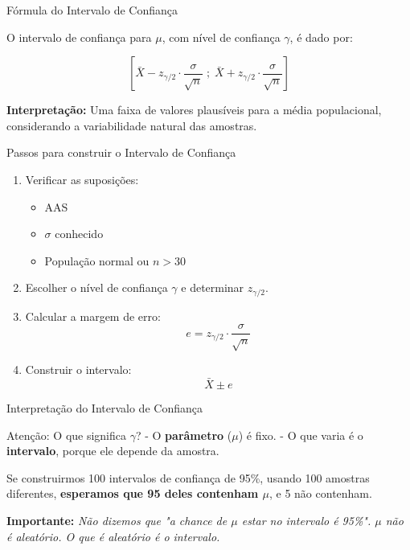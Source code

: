 \documentclass[14pt,aspectratio=1610]{beamer}
\begin{document}
\begin{frame}{Fórmula do Intervalo de Confiança}
	\begin{block}{}
		O intervalo de confiança para $\mu$, com nível de confiança $\gamma$, é dado por:
		
		\[
		\left[
		\bar{X} - z_{\gamma/2} \cdot \frac{\sigma}{\sqrt{n}} \; ; \;
		\bar{X} + z_{\gamma/2} \cdot \frac{\sigma}{\sqrt{n}}
		\right]
		\]
		
		\textbf{Interpretação:} Uma faixa de valores plausíveis para a média populacional, considerando a variabilidade natural das amostras.
	\end{block}
\end{frame}

\begin{frame}{Passos para construir o Intervalo de Confiança}
	\begin{enumerate}
		\item Verificar as suposições:
		\begin{itemize}
			\item AAS
			\item $\sigma$ conhecido
			\item População normal ou $n > 30$
		\end{itemize}
		\item Escolher o nível de confiança $\gamma$ e determinar $z_{\gamma/2}$.
		\item Calcular a margem de erro:
		\[
		e = z_{\gamma/2} \cdot \frac{\sigma}{\sqrt{n}}
		\]
		\item Construir o intervalo:
		\[
		\bar{X} \pm e
		\]
	\end{enumerate}
\end{frame}

\begin{frame}{Interpretação do Intervalo de Confiança}
	\begin{block}{Atenção: O que significa $\gamma$?}
		\justifying
		- O \textbf{parâmetro} ($\mu$) é fixo.  
		- O que varia é o \textbf{intervalo}, porque ele depende da amostra.  
		
		Se construirmos 100 intervalos de confiança de 95\%, usando 100 amostras diferentes, \textbf{esperamos que 95 deles contenham $\mu$}, e 5 não contenham.
		
		\textbf{Importante:} \textit{Não dizemos que "a chance de $\mu$ estar no intervalo é 95\%". $\mu$ não é aleatório. O que é aleatório é o intervalo.}
	\end{block}
\end{frame}
\end{document}
